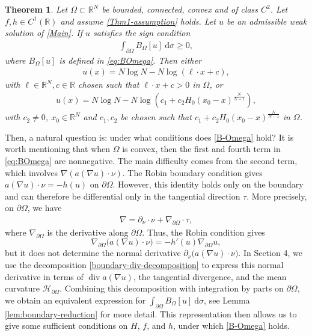 \documentclass[reqno, 11pt]{amsart} %
\numberwithin{equation}{section}
\newtheorem{thm}{Theorem}[section]
\theoremstyle{definition}
\newcommand{\pa}{\partial}
\newcommand{\R}{\mathbb{R}}
\begin{document}
\begin{thm}\label{Thm3}
    Let $\Omega\subset\R^N$ be bounded, connected, convex and of class $C^2$.  Let $f,h\in C^1(\R)$ and assume \eqref{Thm1-assumption} holds.  Let $u$ be an admissible weak solution of \eqref{Main}.  If $u$ satisfies the sign condition
    \begin{align}\label{B-Omega}
        \int_{\pa \Omega} B_{\Omega}[u] \ \text{d} \sigma \geq 0,
    \end{align}
    where $B_{\Omega}[u]$ is defined in \eqref{eq:BOmega}. Then either
    \begin{align}\label{linear-log}
        u(x) = N \log N - N \log (\ell \cdot x + c),
    \end{align}
    with $\ell \in \R^N, c \in \R$ chosen such that $\ell \cdot x + c > 0 $ in $\Omega$, or
    \begin{align}\label{bubble-log}
        u(x) = N \log N - N \log (c_1 + c_2 H_0( x_0 -x )^{\frac{N}{N-1}}),
    \end{align}
    with $c_2 \neq 0$, $x_0 \in \R^N$ and $c_1, c_2$ be chosen such that $c_1 + c_2 H_0(x_0-x)^{\frac{N}{N-1}} $ in $\Omega$.
\end{thm}

Then, a natural question is: under what conditions does
\eqref{B-Omega} hold? It is worth mentioning that when $\Omega$ is convex, then the first and fourth term in \eqref{eq:BOmega} are nonnegative. The main difficulty comes from the second term, which involves $\nabla (a(\nabla u) \cdot \nu)$. The Robin boundary condition gives $a(\nabla u) \cdot \nu = -h(u)$ on $\pa \Omega$. However, this identity holds only on the boundary and can therefore be differential only in the tangential direction $\tau$. More precisely, on $\partial\Omega$, we have
\begin{align*}
    \nabla  = \pa_{\nu} \cdot \nu+ \nabla_{\pa \Omega} \cdot \tau,
\end{align*}
where $\nabla_{\pa \Omega}$ is the derivative along $\pa \Omega$. Thus, the Robin condition gives
\[
    \nabla_{\partial\Omega} \bigl(a(\nabla u)\cdot\nu\bigr) = -h'(u)\nabla_{\partial\Omega}u,
\]
but it does not determine the normal derivative $ \partial_\nu\bigl(a(\nabla u)\cdot\nu\bigr)$. In Section 4, we use the decomposition \eqref{boundary-div-decomposition} to express this normal derivative
in terms of $\operatorname{div}a(\nabla u)$, the tangential
divergence, and the mean curvature $\mathcal H_{\partial\Omega}$. Combining this decomposition with
integration by parts on $\partial\Omega$, we obtain an equivalent expression for $\int_{\partial\Omega} B_\Omega[u]\ \text{d}\sigma$, see Lemma \ref{lem:boundary-reduction} for more detail. This representation then allows us to give some sufficient conditions on $H$, $f$, and $h$, under which \eqref{B-Omega} holds.
\end{document}
